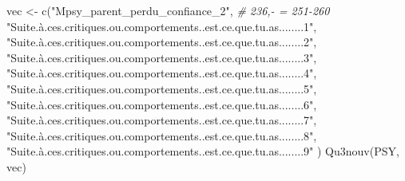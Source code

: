 \documentclass[
]{article}
\newenvironment{Shaded}{\begin{snugshade}}{\end{snugshade}}
\newcommand{\CommentTok}[1]{\textcolor[rgb]{0.56,0.35,0.01}{\textit{#1}}}
\newcommand{\FunctionTok}[1]{\textcolor[rgb]{0.00,0.00,0.00}{#1}}
\newcommand{\NormalTok}[1]{#1}
\newcommand{\OtherTok}[1]{\textcolor[rgb]{0.56,0.35,0.01}{#1}}
\newcommand{\StringTok}[1]{\textcolor[rgb]{0.31,0.60,0.02}{#1}}
\begin{document}
\begin{Shaded}
\begin{Highlighting}[]
\NormalTok{vec }\OtherTok{\textless{}{-}} \FunctionTok{c}\NormalTok{(}\StringTok{"Mpsy\_parent\_perdu\_confiance\_2"}\NormalTok{,                               }\CommentTok{\# 236,{-} = 251{-}260}
         \StringTok{"Suite.à.ces.critiques.ou.comportements..est.ce.que.tu.as........1"}\NormalTok{,}
         \StringTok{"Suite.à.ces.critiques.ou.comportements..est.ce.que.tu.as........2"}\NormalTok{,}
         \StringTok{"Suite.à.ces.critiques.ou.comportements..est.ce.que.tu.as........3"}\NormalTok{,}
         \StringTok{"Suite.à.ces.critiques.ou.comportements..est.ce.que.tu.as........4"}\NormalTok{,}
         \StringTok{"Suite.à.ces.critiques.ou.comportements..est.ce.que.tu.as........5"}\NormalTok{,}
         \StringTok{"Suite.à.ces.critiques.ou.comportements..est.ce.que.tu.as........6"}\NormalTok{,}
         \StringTok{"Suite.à.ces.critiques.ou.comportements..est.ce.que.tu.as........7"}\NormalTok{,}
         \StringTok{"Suite.à.ces.critiques.ou.comportements..est.ce.que.tu.as........8"}\NormalTok{,}
         \StringTok{"Suite.à.ces.critiques.ou.comportements..est.ce.que.tu.as........9"}
\NormalTok{     )}
\FunctionTok{Qu3nouv}\NormalTok{(PSY, vec)}
\end{Highlighting}
\end{Shaded}
\end{document}
